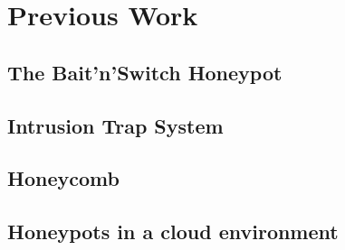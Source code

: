 \chapter{Previous Work}

\section{The Bait'n'Switch Honeypot}

\cite{Diebold2005}

\section{Intrusion Trap System}

\cite{Diebold2005}

\section{Honeycomb}

\cite{Diebold2005}

\section{Honeypots in a cloud environment}

\cite{Kelly2021}